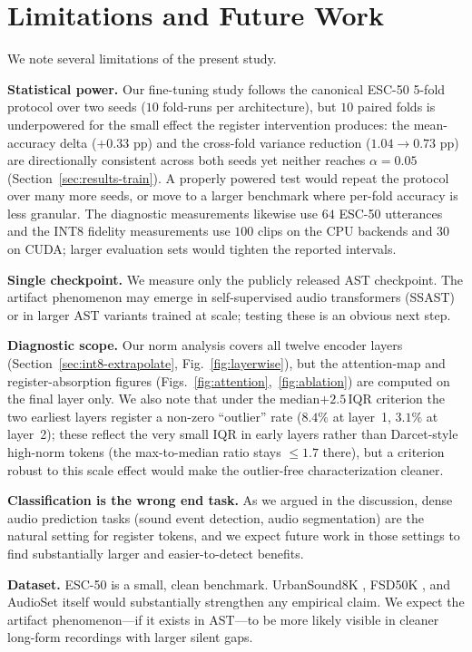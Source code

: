 \documentclass[conference]{IEEEtran}
\begin{document}
\section{Limitations and Future Work}

We note several limitations of the present study.

\textbf{Statistical power.} Our fine-tuning study follows the canonical ESC-50 5-fold protocol over two seeds ($10$ fold-runs per architecture), but $10$ paired folds is underpowered for the small effect the register intervention produces: the mean-accuracy delta ($+0.33$ pp) and the cross-fold variance reduction ($1.04 \to 0.73$ pp) are directionally consistent across both seeds yet neither reaches $\alpha=0.05$ (Section~\ref{sec:results-train}). A properly powered test would repeat the protocol over many more seeds, or move to a larger benchmark where per-fold accuracy is less granular. The diagnostic measurements likewise use $64$ ESC-50 utterances and the INT8 fidelity measurements use $100$ clips on the CPU backends and $30$ on CUDA; larger evaluation sets would tighten the reported intervals.

\textbf{Single checkpoint.} We measure only the publicly released AST checkpoint. The artifact phenomenon may emerge in self-supervised audio transformers (SSAST) or in larger AST variants trained at scale; testing these is an obvious next step.

\textbf{Diagnostic scope.} Our norm analysis covers all twelve encoder layers (Section~\ref{sec:int8-extrapolate}, Fig.~\ref{fig:layerwise}), but the attention-map and register-absorption figures (Figs.~\ref{fig:attention},~\ref{fig:ablation}) are computed on the final layer only. We also note that under the median$+2.5\,$IQR criterion the two earliest layers register a non-zero ``outlier'' rate ($8.4\%$ at layer~1, $3.1\%$ at layer~2); these reflect the very small IQR in early layers rather than Darcet-style high-norm tokens (the max-to-median ratio stays $\leq 1.7$ there), but a criterion robust to this scale effect would make the outlier-free characterization cleaner.

\textbf{Classification is the wrong end task.} As we argued in the discussion, dense audio prediction tasks (sound event detection, audio segmentation) are the natural setting for register tokens, and we expect future work in those settings to find substantially larger and easier-to-detect benefits.

\textbf{Dataset.} ESC-50 is a small, clean benchmark. UrbanSound8K \cite{salamon2014dataset}, FSD50K \cite{fonseca2022fsd50k}, and AudioSet itself would substantially strengthen any empirical claim. We expect the artifact phenomenon---if it exists in AST---to be more likely visible in cleaner long-form recordings with larger silent gaps.
\end{document}
